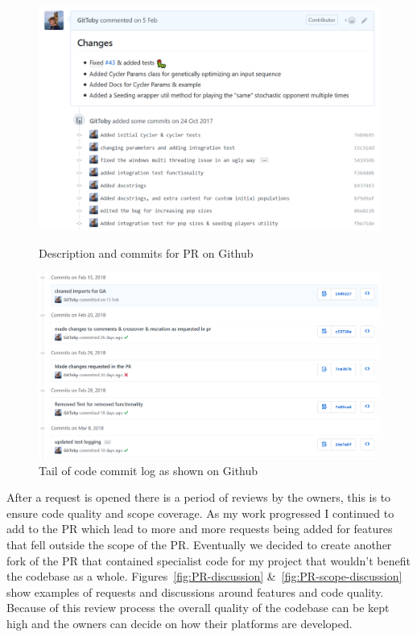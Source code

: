 \begin{figure}[ht]
    \centering
    \begin{minipage}{0.48\textwidth}
        \centering
        \includegraphics[width=1.0\textwidth, center]{./img/vcs/PR-Open.png}
        \caption{Description and commits for PR on Github}\label{fig:PR-open}
    \end{minipage}\hfill
    \begin{minipage}{0.48\textwidth}
        \centering
        \includegraphics[width=1.0\textwidth, center,keepaspectratio]{./img/vcs/commit-log.png}    
        \caption{Tail of code commit log as shown on Github}\label{fig:commit-log}
    \end{minipage}
\end{figure}

After a request is opened there is a period of reviews by the owners, this is to ensure code quality and scope coverage. 
As my work progressed I continued to add to the PR which lead to more and more requests being added for features that fell outside the scope of the PR.
Eventually we decided to create another fork of the PR that contained specialist code for my project that wouldn't benefit the codebase as a whole.
Figures~\ref{fig:PR-discussion} \&~\ref{fig:PR-scope-discussion} show examples of requests and discussions around features and code quality.
Because of this review process the overall quality of the codebase can be kept high and the owners can decide on how their platforms are developed.

